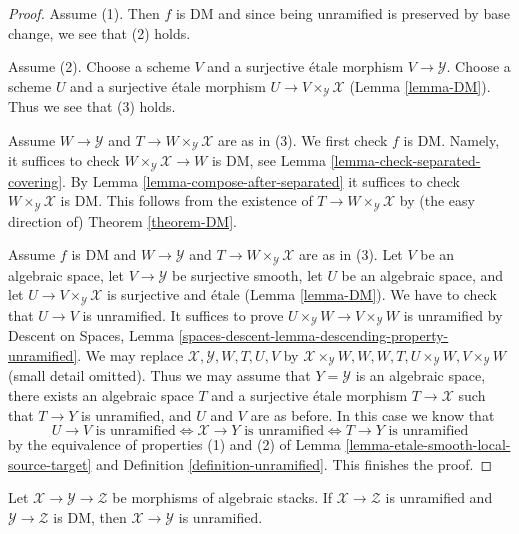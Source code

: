 \begin{proof}
Assume (1). Then $f$ is DM and since being unramified is preserved
by base change, we see that (2) holds.

\medskip\noindent
Assume (2). Choose a scheme $V$ and a surjective \'etale morphism
$V \to \mathcal{Y}$. Choose a scheme $U$ and a surjective \'etale morphism
$U \to V \times_\mathcal{Y} \mathcal{X}$ (Lemma \ref{lemma-DM}).
Thus we see that (3) holds.

\medskip\noindent
Assume $W \to \mathcal{Y}$ and $T \to W \times_\mathcal{Y} \mathcal{X}$
are as in (3). We first check $f$ is DM. Namely, it suffices to check
$W \times_\mathcal{Y} \mathcal{X} \to W$ is DM, see
Lemma \ref{lemma-check-separated-covering}.
By Lemma \ref{lemma-compose-after-separated}
it suffices to check $W \times_\mathcal{Y} \mathcal{X}$ is DM.
This follows from the existence of $T \to W \times_\mathcal{Y} \mathcal{X}$
by (the easy direction of) Theorem \ref{theorem-DM}.

\medskip\noindent
Assume $f$ is DM and $W \to \mathcal{Y}$ and
$T \to W \times_\mathcal{Y} \mathcal{X}$ are as in (3).
Let $V$ be an algebraic space, let $V \to \mathcal{Y}$ be surjective smooth,
let $U$ be an algebraic space, and let
$U \to V \times_\mathcal{Y} \mathcal{X}$ is surjective and \'etale
(Lemma \ref{lemma-DM}). We have to check that $U \to V$ is unramified.
It suffices to prove $U \times_\mathcal{Y} W \to V \times_\mathcal{Y} W$
is unramified by Descent on Spaces, Lemma
\ref{spaces-descent-lemma-descending-property-unramified}.
We may replace $\mathcal{X}, \mathcal{Y}, W, T, U, V$ by
$\mathcal{X} \times_\mathcal{Y} W, W, W, T, U \times_\mathcal{Y} W,
V \times_\mathcal{Y} W$ (small detail omitted).
Thus we may assume that $Y = \mathcal{Y}$ is an algebraic space, there exists
an algebraic space $T$ and a surjective \'etale morphism
$T \to \mathcal{X}$ such that $T \to Y$ is unramified, and $U$ and $V$
are as before. In this case we know that
$$
U \to V\text{ is unramified}
\Leftrightarrow
\mathcal{X} \to Y\text{ is unramified}
\Leftrightarrow
T \to Y\text{ is unramified}
$$
by the equivalence of properties (1) and (2) of
Lemma \ref{lemma-etale-smooth-local-source-target}
and Definition \ref{definition-unramified}.
This finishes the proof.
\end{proof}

\begin{lemma}
\label{lemma-permanence-unramified}
Let $\mathcal{X} \to \mathcal{Y} \to \mathcal{Z}$ be
morphisms of algebraic stacks.
If $\mathcal{X} \to \mathcal{Z}$ is unramified and
$\mathcal{Y} \to \mathcal{Z}$ is DM, then
$\mathcal{X} \to \mathcal{Y}$ is unramified.
\end{lemma}

